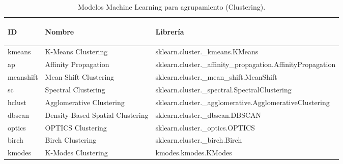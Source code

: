 \begin{table} [!htb]
	\footnotesize
	\begin{threeparttable}
		\caption{Modelos Machine Learning para agrupamiento (Clustering).}
		\label{Clustering_Models}
		\begin{tabular}{p{2cm} p{4cm} p{9cm}} \toprule	
		\begin{center}ID\end{center}   
		&\begin{center}Nombre\end{center}             
		&\begin{center}Librería\end{center}      
		\\ \hline kmeans & K-Means Clustering & sklearn.cluster.\_kmeans.KMeans
		\\ \hline ap & Affinity Propagation & sklearn.cluster.\_affinity\_propagation.AffinityPropagation
		\\ \hline meanshift & Mean Shift Clustering & sklearn.cluster.\_mean\_shift.MeanShift
		\\ \hline sc & Spectral Clustering & sklearn.cluster.\_spectral.SpectralClustering
		\\ \hline hclust & Agglomerative Clustering & sklearn.cluster.\_agglomerative.AgglomerativeClustering
		\\ \hline dbscan & Density-Based Spatial Clustering & sklearn.cluster.\_dbscan.DBSCAN
		\\ \hline optics & OPTICS Clustering & sklearn.cluster.\_optics.OPTICS
		\\ \hline birch & Birch Clustering & sklearn.cluster.\_birch.Birch
		\\ \hline kmodes & K-Modes Clustering & kmodes.kmodes.KModes
		\\ \hline
		\end{tabular}
	\end{threeparttable}
\end{table}


